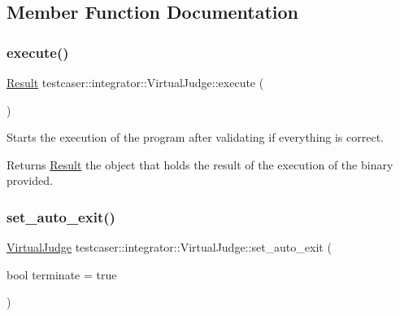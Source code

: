 \subsection{Member Function Documentation}
\mbox{\label{classtestcaser_1_1integrator_1_1VirtualJudge_ab50e9c4506fba192fd44fce0f2a21744}} 
\subsubsection{\texorpdfstring{execute()}{execute()}}
{\footnotesize\ttfamily \hyperlink{classtestcaser_1_1integrator_1_1Result}{Result} testcaser\+::integrator\+::\+Virtual\+Judge\+::execute (\begin{DoxyParamCaption}{ }\end{DoxyParamCaption})\hspace{0.3cm}{\ttfamily [inline]}}



Starts the execution of the program after validating if everything is correct. 

\begin{DoxyReturn}{Returns}
\hyperlink{classtestcaser_1_1integrator_1_1Result}{Result} the object that holds the result of the execution of the binary provided. 
\end{DoxyReturn}
\mbox{\label{classtestcaser_1_1integrator_1_1VirtualJudge_a9160dd070c63084495fe6d29cab58cb4}} 
\subsubsection{\texorpdfstring{set\+\_\+auto\+\_\+exit()}{set\_auto\_exit()}}
{\footnotesize\ttfamily \hyperlink{classtestcaser_1_1integrator_1_1VirtualJudge}{Virtual\+Judge} testcaser\+::integrator\+::\+Virtual\+Judge\+::set\+\_\+auto\+\_\+exit (\begin{DoxyParamCaption}\item[{bool}]{terminate = {\ttfamily true} }\end{DoxyParamCaption})\hspace{0.3cm}{\ttfamily [inline]}}



